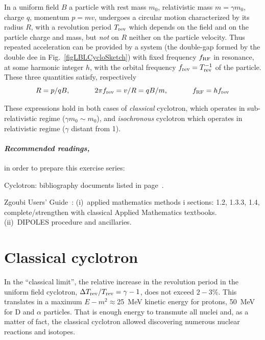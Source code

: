 In a uniform field $B$ a  particle with rest mass $m_0$, 
relativistic mass $m=\gamma m_0$, charge $q$, momentum $p=mv$, undergoes a circular motion
characterized by its radius $R$, with a revolution period $T_{\rm rev}$ which depends on the field 
and on the particle charge and mass, but \emph{not} on $R$ neither on the particle velocity. 
Thus repeated acceleration can be provided by a system (the double-gap formed by the double dee in Fig.~\ref{figLBLCycloSketch}) 
with fixed frequency $f_{\rm RF}$ in resonance, at some harmonic integer $h$, 
 with the orbital frequency $f_{\rm rev}=T^{-1}_{\rm rev}$ of the particle. These three quantities satisfy, respectively 
\begin{equation}
\label{EqRCyclo}
 R = p / qB, \hspace{.1\linewidth} 2\pi f_{\rm rev} = v/R = q B / m, \hspace{.1\linewidth} f_{\rm RF} = h f_{\rm rev}
\end{equation}

These expressions hold in both cases of  \emph{classical} cyclotron, which  operates in 
 sub-relativistic regime ($\gamma m_0\sim m_0$), 
and  \emph{isochronous} cyclotron which operates in  relativistic regime ($\gamma $ distant from 1).  


\paragraph {\sl Recommended readings,} in order to prepare this exercise series:

Cyclotron: bibliography documents listed in page~\pageref{SecBiblioCyclotron}.

Zgoubi Users' Guide~: (i)~applied mathematics methods i sections: 1.2, 1.3.3, 1.4,  
complete/strengthen with classical Applied Mathematics textbooks. (ii)~DIPOLES procedure and ancillaries.



\section{Classical cyclotron \label{secCycloClass}}


In the ``classical limit'', the relative increase in the revolution period in the uniform field cyclotron,
 $\Delta T_{\rm rev}/T_{\rm rev} = \gamma-1 $,  does not exceed $2-3$\%.  
This translates in a maximum $E-m^2 \approx$25~MeV kinetic energy for protons, 50~MeV for D and $\alpha$ particles. 
That is enough energy to transmute all nuclei and, as a matter of fact, the classical cyclotron allowed discovering 
numerous nuclear reactions and isotopes. 



